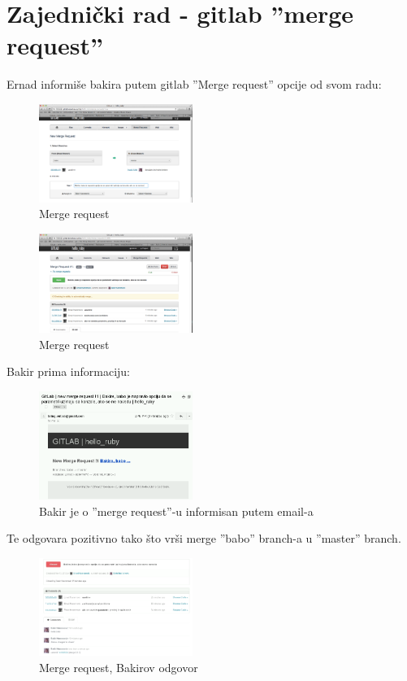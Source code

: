 \documentclass[times, utf8, seminar]{fit}
\begin{document}
\section{Zajednički rad - gitlab ''merge request''}

Ernad informiše bakira putem gitlab ''Merge request'' opcije od svom radu:

\begin{figure}[H]
\centering
\includegraphics[width=5cm]{img/gitlab_merge_request.png}
\caption{Merge request}
\end{figure}

\begin{figure}[H]
\centering
\includegraphics[width=5cm]{img/gitlab_merge_request_2.png}
\caption{Merge request}
\end{figure}

Bakir prima informaciju:

\begin{figure}[H]
\centering
\includegraphics[width=5cm]{img/gitlab_merge_request_email_notification.png}
\caption{Bakir je o ''merge request''-u informisan putem email-a}
\end{figure}

Te odgovara pozitivno tako što vrši merge ''babo'' branch-a u ''master'' branch.
\begin{figure}[H]
\centering
\includegraphics[width=5cm]{img/gitlab_merge_request_answer.png}
\caption{Merge request, Bakirov odgovor}
\end{figure}
\end{document}
